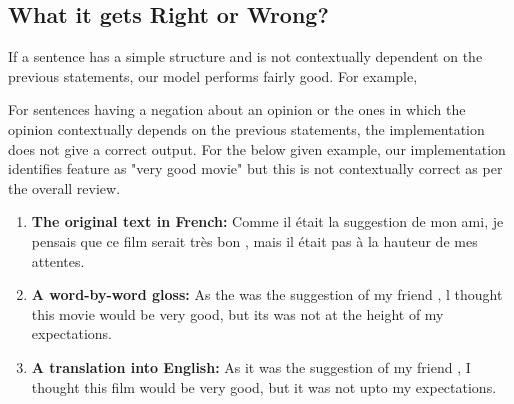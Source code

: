 \documentclass[conference]{IEEEtran}
\begin{document}
\subsection{\textbf{What it gets Right or Wrong?}}
\indent If a sentence has a simple structure and is not contextually dependent on the previous statements, our model performs fairly good. For example,
\indent For sentences having a negation about an opinion or the ones in which the opinion contextually depends on the previous statements, the implementation does not give a correct output. For the below given example, our implementation identifies feature as "very good movie" but this is not contextually correct as per the overall review.
\begin{enumerate} \item \textbf{The original text in French:} Comme il était la suggestion de mon ami, je pensais que ce film serait très bon , mais il était pas à la hauteur de mes attentes.
\item \textbf{A word-by-word gloss:} As the  was the suggestion of my friend , l thought this movie would be very good, but its was not at the height of my expectations.
\item \textbf{A translation into English:}  As it was the suggestion of my friend , I thought this film would be very good, but it was not upto my expectations.
\end{enumerate}
\end{document}
